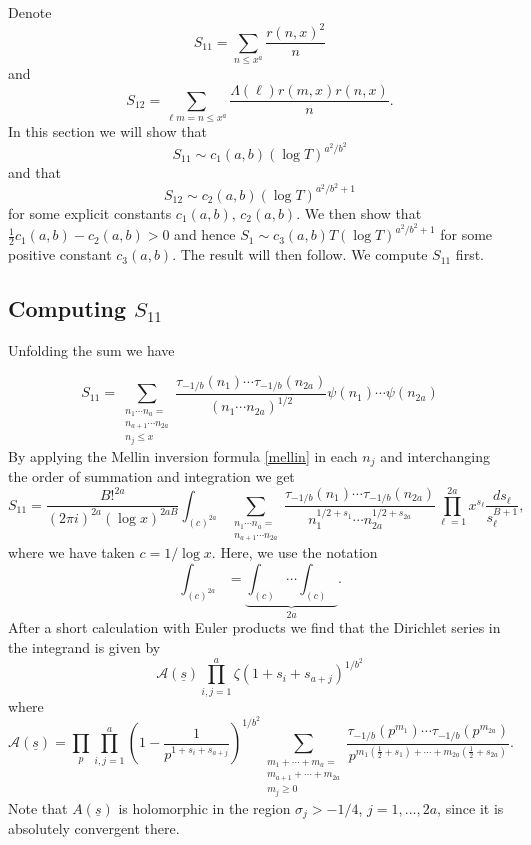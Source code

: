 \documentclass[oneside, 12pt]{amsart}
\theoremstyle{definition}
\newcommand{\mc}{\mathcal}
\newcommand{\ul}{\underline}
\newcommand{\leqs}{\leqslant }
\begin{document}
Denote
\[
S_{11}=\sum_{n\leqs x^a}\frac{r(n,x)^2}{n}
\]
and 
\[
S_{12}=\sum_{\ell m=n\leqs x^a}\frac{\Lambda(\ell)r(m,x)r(n,x)}{n}.
\]
In this section we will show that
\[S_{11}\sim c_1(a,b)(
\log T)^{a^2/b^2}  \]
and that 
\[S_{12}\sim c_2(a,b)(
\log T)^{a^2/b^2+1}  \]
for some explicit constants $c_1(a,b)$, $c_2(a,b)$. We then show that $\tfrac{1}{2}c_1(a,b)-c_2(a,b)>0$ and hence 
$S_1\sim c_3(a,b)T(\log T)^{a^2/b^2+1}$ for some positive constant $c_3(a,b)$. The result will then follow. 
We compute $S_{11}$ first. 


\subsection{Computing $S_{11}$}
Unfolding the sum we have 
 
\[
 S_{11}=\sum_{\substack{n_1\cdots n_a=\\n_{a+1}\cdots n_{2a}\\ n_j\leqs x}}\frac{\tau_{-1/b}(n_1)\cdots \tau_{-1/b}(n_{2a})}{(n_1\cdots n_{2a})^{1/2}} \psi(n_1)\cdots\psi(n_{2a})
\]
By applying the Mellin inversion formula \eqref{mellin} in each $n_j$ and interchanging the order of summation and integration we get 
\[
S_{11}=\frac{B!^{2a}}{(2\pi i)^{2a}( \log x)^{2aB}}\int_{(c)^{2a}}
\sum_{\substack{n_1\cdots n_a=\\n_{a+1}\cdots n_{2a}}}
\frac{\tau_{-1/b}(n_1)\cdots \tau_{-1/b}(n_{2a})}{n_1^{1/2+s_1}\cdots n_{2a}^{1/2+s_{2a}}}
 \prod_{\ell=1}^{2a}x^{s_\ell}\frac{ds_\ell}{s_\ell^{B+1}},  
\]
where we have taken $c={ 1 }/{\log x}$. Here, we use the notation
\[
\int_{(c)^{2a}}=\underbrace{\int_{(c)}\cdots\int_{(c)}}_{2a}.
\]
After a short calculation with Euler products we find that the Dirichlet series in the integrand is given by 
\[
 \mc{A}(\ul{s}) \prod_{i,j=1}^a\zeta(1+s_i+s_{a+j})^{1/b^2} 
\]
where 
\begin{equation}
\label{A(s)}
  \mc{A}(\ul{s}) = \prod_p\prod_{i,j=1}^a\left( 1 - \frac{ 1 }{ p^{1+s_i+s_{a+j}} } \right)^{1/b^2}\sum_{ \substack{ m_1+\cdots+m_a=\\ m_{a+1}+\cdots+m_{2a}\\m_j\geqslant 0 } } \frac{ \tau_{-1/b}(p^{m_1})\cdots \tau_{-1/b}(p^{m_{2a}}) }{ p^{ m_1(\frac{1}{2}+s_1 )+\cdots+m_{2a}( \frac{1}{2}+s_{2a} ) } }.
\end{equation}
Note that $A(\ul{s})$ is holomorphic in the region $\sigma_j>-1/4$, $j=1,\ldots,2a$, since it is absolutely convergent there. 
\end{document}
